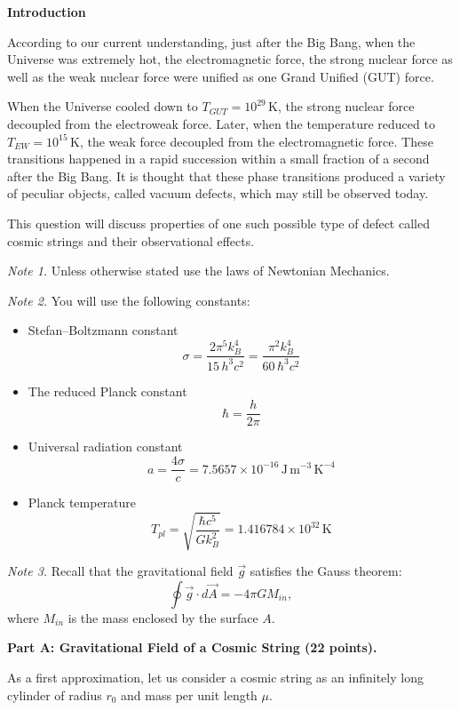 \textbf{Introduction}

According to our current understanding, just after the Big Bang, when the
Universe was extremely hot, the electromagnetic force, the strong nuclear
force as well as the weak nuclear force were unified as one Grand Unified
(GUT) force.

When the Universe cooled down to $T_{GUT} = 10^{29}$\,K, the strong nuclear
force decoupled from the electroweak force. Later, when the temperature
reduced to $T_{EW} = 10^{15}$\,K, the weak force decoupled from the
electromagnetic force. These transitions happened in a rapid succession within
a small fraction of a second after the Big Bang. It is thought that these
phase transitions produced a variety of peculiar objects, called vacuum
defects, which may still be observed today.

This question will discuss properties of one such possible type of defect
called cosmic strings and their observational effects.

\emph{Note 1.} Unless otherwise stated use the laws of Newtonian Mechanics.

\emph{Note 2.} You will use the following constants:
\begin{itemize}
\item Stefan--Boltzmann constant
  \[ \sigma = \frac{2\pi^5 k_B^4}{15\,h^3 c^2}
            = \frac{\pi^2 k_B^4}{60\,\hbar^3 c^2} \]
\item The reduced Planck constant
  \[ \hbar = \frac{h}{2\pi} \]
\item Universal radiation constant
  \[ a = \frac{4\sigma}{c}
       = 7.5657 \times 10^{-16}\,\mathrm{J\,m^{-3}\,K^{-4}} \]
\item Planck temperature
  \[ T_{pl} = \sqrt{\frac{\hbar c^5}{G k_B^2}}
            = 1.416784 \times 10^{32}\,\mathrm{K} \]
\end{itemize}

\emph{Note 3.} Recall that the gravitational field $\vec{g}$ satisfies the
Gauss theorem:
\[ \oint \vec{g}\cdot d\vec{A} = -4\pi G M_{in}, \]
where $M_{in}$ is the mass enclosed by the surface $A$.

\medskip
\textbf{Part A: Gravitational Field of a Cosmic String (22 points).}

As a first approximation, let us consider a cosmic string as an infinitely
long cylinder of radius $r_0$ and mass per unit length $\mu$.

